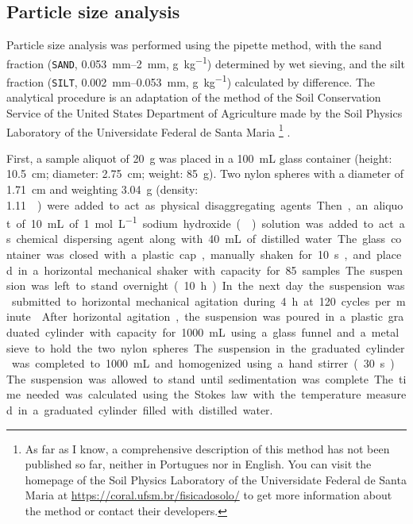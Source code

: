 \tocless\subsection{Particle size analysis}

Particle size analysis was performed using the pipette method, with the sand fraction 
(\texttt{SAND}, \SIrange{0.053}{2}{\milli\metre}, \si{\gram\per\kilo\gram}) determined by wet sieving, and the silt 
fraction (\texttt{SILT}, \SIrange{0.002}{0.053}{\milli\metre}, \si{\gram\per\kilo\gram}) calculated by difference. 
The analytical procedure is an adaptation of the method of the Soil Conservation Service of the United States
Department of Agriculture \cite{UnitedStates1972} made by the Soil Physics Laboratory of the Universidate
Federal de Santa Maria \footnote{As far as I know, a comprehensive description of this method has not been 
published so far, neither in Portugues nor in English. You can visit the homepage of the Soil Physics Laboratory 
of the Universidate Federal de Santa Maria at \url{https://coral.ufsm.br/fisicadosolo/} to get more information
about the method or contact their developers.} \cite{SuzukiEtAl2004,SuzukiEtAl2004a}.

First, a sample aliquot of \SI{20}{\gram} was placed in a \SI{100}{\milli\liter} glass container 
(height: \SI{10.5}{\centi\metre}; diameter: \SI{2.75}{\centi\metre}; weight: \SI{85}{\gram}). Two nylon
spheres with a diameter of \SI{1.71}{\centi\metre} and weighting \SI{3.04}{\gram} (density: 
\SI{1.11}{\gram\per\centi\metre\cubic}) were added to act as physical disaggregating agents. Then, an 
aliquot of \SI{10}{\milli\liter} of \SI{1}{\mole\per\liter} sodium hydroxide () solution was 
added to act as chemical dispersing agent along with \SI{40}{\milli\liter} of distilled water. The glass 
container was closed with a plastic cap, manually shaken for \SI{10}{\second}, and placed in a horizontal
mechanical shaker with capacity for \num{85}~samples. The suspension was left to stand overnight 
(\SI{10}{\hour}). In the next day the suspension was submitted to horizontal mechanical agitation during 
\SI{4}{\hour} at \si{120} cycles per minute \cite{SuzukiEtAl2004,SuzukiEtAl2004a}.

After horizontal agitation, the suspension was poured in a plastic graduated cylinder with capacity for 
\SI{1000}{\milli\liter} using a glass funnel and a metal sieve to hold the two nylon spheres. The 
suspension in the graduated cylinder was completed to \SI{1000}{\milli\liter} and homogenized using a
hand stirrer (\SI{30}{\second}). The suspension was allowed to stand until sedimentation was complete. 
The time needed was calculated using the Stokes law with the temperature measured in a graduated cylinder 
filled with distilled water.

